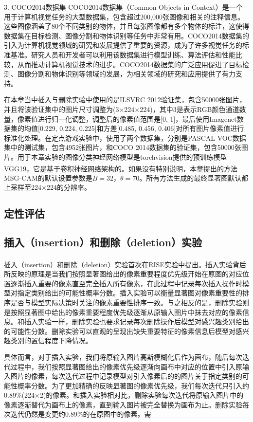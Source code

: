 3. COCO2014数据集
COCO2014数据集（Common Objects in Context）是一个用于计算机视觉任务的大型数据集，包含超过200,000张图像和相关的注释信息。这些图像涵盖了80个不同类别的物体，并且每张图像都有多个物体的标注，这使得数据集在目标检测、图像分割和物体识别等任务中非常有用。COCO2014数据集的引入为计算机视觉领域的研究和发展提供了重要的资源，成为了许多视觉任务的标准基准。研究人员和开发者可以利用该数据集进行模型训练、算法评估和性能比较，从而推动计算机视觉技术的进步。COCO2014数据集的广泛应用促进了目标检测、图像分割和物体识别等领域的发展，为相关领域的研究和应用提供了有力支持。

在本章当中插入与删除实验中使用的是ILSVRC 2012验证集，包含50000张图片，并且将该验证集中的图片尺寸调整为(3$\times$224$\times$224)，其中$3$是表示RGB颜色通道数量，像素值进行归一化调整，调整后的像素值范围是[0, 1]，最后使用Imagenet数据集的均值[0.229, 0.224, 0.225]和方差[0.485, 0.456, 0.406]对所有图片像素值进行标准化处理。在定点游戏实验中，使用了两个数据集，分别是PASCAL VOC数据集中的测试集，包含4952张图片，和COCO 2014数据集的验证集，包含50000张图片。用于本章实验的图像分类神经网络模型是torchvision提供的预训练模型VGG19\textsuperscript{\cite{simonyan2014very}}，它是基于卷积神经网络架构的。如果没有特别说明，本章提出的方法MSG-CAM的默认设置参数是$B=32$，$\theta=70$。所有方法生成的最终显著图默认都上采样至224$\times$224的分辨率。
\subsection{定性评估}

\subsection{插入（insertion）和删除（deletion）实验}
插入（insertion）和删除（deletion）实验首次在RISE\textsuperscript{\cite{petsiuk2018rise}}实验中提出。插入实验背后所反映的原理是当我们按照显著图给出的像素重要程度优先级开始在原图的对应位置逐渐插入重要的像素直至完全插入所有像素，在此过程中记录每次插入操作时模型对指定类别给出的可能性概率分数。插入实验可以衡量显著图对像素重要性的排序是否与模型实际决策时关注的像素重要性排序一致。与之相反的是，删除实验则是按照显著图中给出的像素重要程度优先级逐渐从原输入图片中抹去对应的像素信息。和插入实验一样，删除实验也要求记录每次删除操作后模型对感兴趣类别给出的可能性分数。删除实验可以直观的呈现出缺失重要特征的像素信息后模型对感兴趣类别的置信程度下降情况。

具体而言，对于插入实验，我们将原输入图片高斯模糊化后作为画布，随后每次迭代过程中，我们按照显著图给出的像素优先级逐渐向画布中对应的位置中引入原输入图片的像素，每次迭代过程中记录模型对引入像素后的的图片关于指定类别的可能性概率分数。为了更加精确的反映显著图的像素优先级，我们每次迭代只引入约0.89\%(224$\times$2)的像素。和插入实验相对比，删除实验每次迭代将原输入图片中的像素逐渐替代为画布上的像素，直到输入图片被完全替换为画布为止。删除实验每次迭代仍然是变更约0.89\%的在原图中的像素。需

